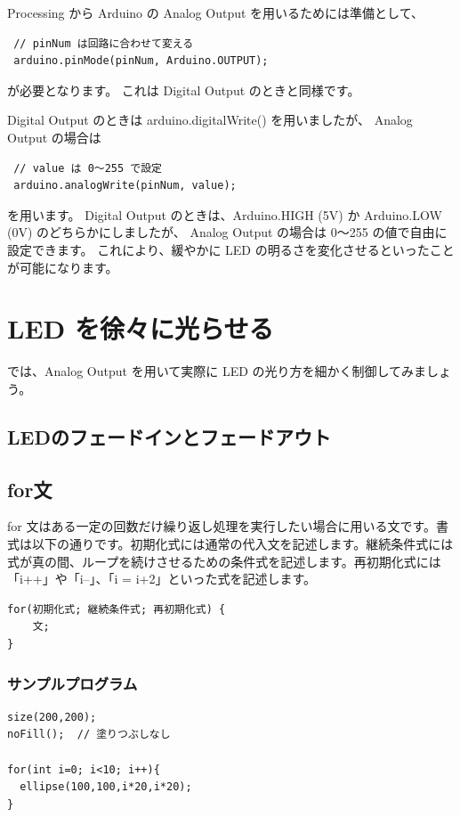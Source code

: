 \documentclass[11pt,a4paper]{jarticle}
\begin{document}
\newpage

Processing から Arduino の Analog Output を用いるためには準備として、
\begin{lstlisting}
 // pinNum は回路に合わせて変える 
 arduino.pinMode(pinNum, Arduino.OUTPUT);
\end{lstlisting}
が必要となります。
これは Digital Output のときと同様です。

Digital Output のときは arduino.digitalWrite() を用いましたが、
Analog Output の場合は
\begin{lstlisting}
 // value は 0〜255 で設定
 arduino.analogWrite(pinNum, value);
\end{lstlisting}
を用います。
Digital Output のときは、Arduino.HIGH (5V) か Arduino.LOW (0V) のどちらかにしましたが、
Analog Output の場合は 0〜255 の値で自由に設定できます。
これにより、緩やかに LED の明るさを変化させるといったことが可能になります。

\section{LED を徐々に光らせる}
では、Analog Output を用いて実際に LED の光り方を細かく制御してみましょう。

\subsection{LEDのフェードインとフェードアウト}

\subsection*{for文}
for 文はある一定の回数だけ繰り返し処理を実行したい場合に用いる文です。書式は以下の通りです。初期化式には通常の代入文を記述します。継続条件式には式が真の間、ループを続けさせるための条件式を記述します。再初期化式には「i++」や「i--」、「i = i+2」といった式を記述します。

\begin{lstlisting}
for(初期化式; 継続条件式; 再初期化式) {
	文;
}
\end{lstlisting}

\subsubsection*{サンプルプログラム}
\begin{lstlisting}
size(200,200);
noFill();  // 塗りつぶしなし

for(int i=0; i<10; i++){
  ellipse(100,100,i*20,i*20);
}
\end{lstlisting}
\end{document}
